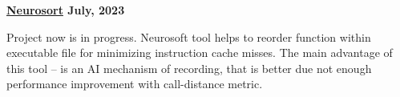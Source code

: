 \textbf{\href{https://github.com/jirol9xa/neurosort} {Neurosort} \hfill  July, 2023} \par
\begin{itemize}
Project now is in progress. Neurosoft tool helps to reorder function within executable file for minimizing instruction cache misses. The main advantage of this tool -- is an AI mechanism of recording, that is better  due not enough performance improvement with call-distance metric.  
\end{itemize} \par